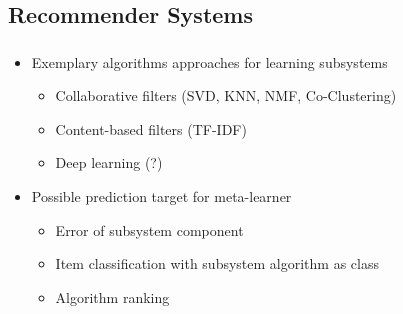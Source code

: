 \documentclass[aspectratio=169]{beamer}
\begin{document}
\subsection{Recommender Systems}
\begin{frame}
	\frametitle{\insertsection}
	\framesubtitle{\insertsubsection}

	\begin{itemize}
		\item Exemplary algorithms approaches for learning subsystems
		\begin{itemize}
			\item Collaborative filters (SVD, KNN, NMF, Co-Clustering)
			\item Content-based filters (TF-IDF)
			\item Deep learning (?)
		\end{itemize}
		\item Possible prediction target for meta-learner
		\begin{itemize}
			\item Error of subsystem component
			\item Item classification with subsystem algorithm as class
			\item Algorithm ranking
		\end{itemize}
	\end{itemize}
\end{frame}
\end{document}
